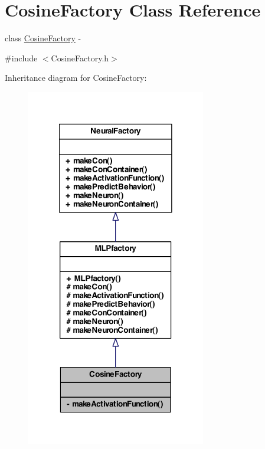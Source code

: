 \hypertarget{class_cosine_factory}{
\section{CosineFactory Class Reference}
\label{class_cosine_factory}
}


class \hyperlink{class_cosine_factory}{CosineFactory} -\/  




{\ttfamily \#include $<$CosineFactory.h$>$}



Inheritance diagram for CosineFactory:
\nopagebreak
\begin{figure}[H]
\begin{center}
\leavevmode
\includegraphics[width=222pt]{class_cosine_factory__inherit__graph}
\end{center}
\end{figure}


